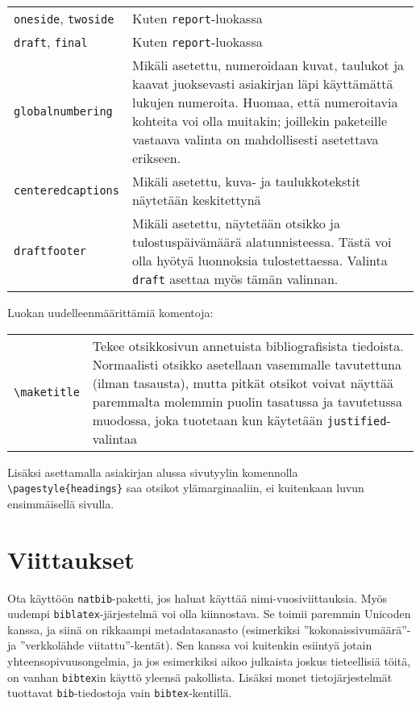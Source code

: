 \documentclass[globalnumbering,centeredcaptions,draftfooter]{tutthesis/tutthesis} %
\begin{document}
\begin{tabular}[h]{@{} p{} p{} @{}}
\texttt{oneside}, \texttt{twoside} & Kuten \texttt{report}-luokassa \\
\texttt{draft}, \texttt{final} & Kuten \texttt{report}-luokassa \\
\texttt{globalnumbering} & Mikäli asetettu, numeroidaan kuvat, taulukot ja kaavat juoksevasti asiakirjan läpi käyttämättä lukujen numeroita. Huomaa, että numeroitavia kohteita voi olla muitakin; joillekin paketeille vastaava valinta on mahdollisesti asetettava erikseen. \\
\texttt{centeredcaptions} & Mikäli asetettu, kuva- ja taulukkotekstit näytetään keskitettynä\\
\texttt{draftfooter} & Mikäli asetettu, näytetään otsikko ja tulostuspäivämäärä alatunnisteessa. Tästä voi olla hyötyä luonnoksia tulostettaessa. Valinta \texttt{draft} asettaa myös tämän valinnan.
\end{tabular}

Luokan uudelleenmäärittämiä komentoja:

\begin{tabular}[h]{@{} p{} p{} @{}}
  \verb|\maketitle| & Tekee otsikkosivun annetuista bibliografisista tiedoista. Normaalisti otsikko asetellaan vasemmalle tavutettuna (ilman tasausta), mutta pitkät otsikot voivat näyttää paremmalta molemmin puolin tasatussa ja tavutetussa muodossa, joka tuotetaan kun käytetään \texttt{justified}-valintaa
\end{tabular}

Lisäksi asettamalla asiakirjan alussa sivutyylin komennolla \verb|\pagestyle{headings}| saa otsikot ylämarginaaliin, ei kuitenkaan luvun ensimmäisellä sivulla.

\section{Viittaukset}
Ota käyttöön \texttt{natbib}-paketti, jos haluat käyttää nimi-vuosiviittauksia.
Myös uudempi \texttt{biblatex}-järjestelmä voi olla kiinnostava.
Se toimii paremmin Unicoden kanssa, ja siinä on rikkaampi metadatasanasto (esimerkiksi ''kokonaissivumäärä''- ja ''verkkolähde viitattu''-kentät).
Sen kanssa voi kuitenkin esiintyä jotain yhteensopivuusongelmia, ja jos esimerkiksi aikoo julkaista joskus tieteellisiä töitä, on vanhan \texttt{bibtex}in käyttö yleensä pakollista.
Lisäksi monet tietojärjestelmät tuottavat \texttt{bib}-tiedostoja vain \texttt{bibtex}-kentillä.
\end{document}
